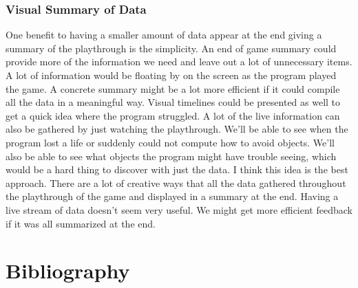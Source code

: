 \documentclass{scrreprt}
\begin{document}
\subsection{Visual Summary of Data}
One benefit to having a smaller amount of data appear at the end giving a summary of the playthrough is the simplicity.
An end of game summary could provide more of the information we need and leave out a lot of unnecessary items.
A lot of information would be floating by on the screen as the program played the game.
A concrete summary might be a lot more efficient if it could compile all the data in a meaningful way.
Visual timelines could be presented as well to get a quick idea where the program struggled.
A lot of the live information can also be gathered by just watching the playthrough.
We'll be able to see when the program lost a life or suddenly could not compute how to avoid objects.
We'll also be able to see what objects the program might have trouble seeing, which would be a hard thing to discover with just the data.
I think this idea is the best approach.
There are a lot of creative ways that all the data gathered throughout the playthrough of the game and displayed in a summary at the end.
Having a live stream of data doesn't seem very useful.
We might get more efficient feedback if it was all summarized at the end.





\chapter{Bibliography}
\end{document}
